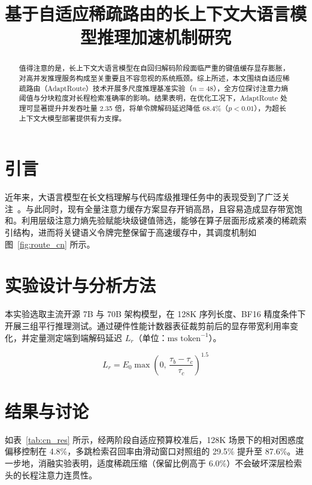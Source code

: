 \documentclass[UTF8]{ctexart}
\title{基于自适应稀疏路由的长上下文大语言模型推理加速机制研究}
\begin{document}
\maketitle

\begin{abstract}
值得注意的是，长上下文大语言模型在自回归解码阶段面临严重的键值缓存显存膨胀，对高并发推理服务构成至关重要且不容忽视的系统瓶颈。综上所述，本文围绕自适应稀疏路由（AdaptRoute）技术开展多尺度推理基准实验（$n = 48$），全方位探讨注意力熵阈值与分块粒度对长程检索准确率的影响。结果表明，在优化工况下，AdaptRoute 处理可显著提升并发吞吐量 2.35 倍，将单令牌解码延迟降低 68.4\%（$p < 0.01$），为超长上下文大模型部署提供有力支撑。
\end{abstract}

\section{引言}
近年来，大语言模型在长文档理解与代码库级推理任务中的表现受到了广泛关注~\cite{dao2022neurips,vaswani2017neurips}。与此同时，现有全量注意力缓存方案显存开销高昂，且容易造成显存带宽饱和。利用层级注意力熵先验赋能块级键值筛选，能够在算子层面形成紧凑的稀疏索引结构，进而将关键语义令牌完整保留于高速缓存中，其调度机制如图~\ref{fig:route_cn} 所示。

\section{实验设计与分析方法}
本实验选取主流开源 7B 与 70B 架构模型，在 128K 序列长度、BF16 精度条件下开展三组平行推理测试。通过硬件性能计数器表征裁剪前后的显存带宽利用率变化，并定量测定端到端解码延迟 $L_r$（单位：$\text{ms token}^{-1}$）。

\begin{equation}
L_r = E_0 \max\!\left(0,\, \frac{\tau_b - \tau_c}{\tau_c}\right)^{1.5}
\end{equation}

\section{结果与讨论}
如表~\ref{tab:cn_res} 所示，经两阶段自适应预算校准后，128K 场景下的相对困惑度偏移控制在 4.8\%，多跳检索召回率由滑动窗口对照组的 29.5\% 提升至 87.6\%。进一步地，消融实验表明，适度稀疏压缩（保留比例高于 6.0\%）不会破坏深层检索头的长程注意力连贯性。
\end{document}
